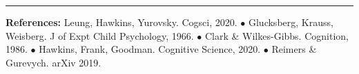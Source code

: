 \documentclass[11pt,a4paper]{article}
\begin{document}
\vspace{5pt}
\rule{\textwidth}{1pt}


\begin{minipage}{\textwidth}
	\vspace{5pt}
	\begin{small} \textbf{References:}%
Leung, Hawkins, Yurovsky. Cogsci, 2020. $\bullet$ Glucksberg, Krauss, Weisberg. J of Expt Child Psychology, 1966. $\bullet$ Clark \& Wilkes-Gibbs. Cognition, 1986. $\bullet$ Hawkins, Frank, Goodman. Cognitive Science, 2020. $\bullet$ Reimers \& Gurevych. arXiv 2019.
\end{small}
\end{minipage}
\end{document}
